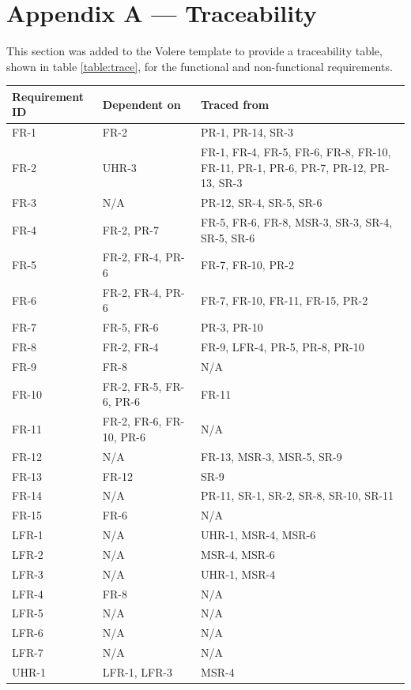 \documentclass[12pt]{article}
\begin{document}
\newpage{}
\section{Appendix A --- Traceability}
This section was added to the Volere template to provide a traceability table,
shown in table \ref{table:trace}, for the functional and non-functional requirements.
\begin{longtable}[c]{| m{3.4cm} | m{4cm} | m{5.3cm} |}
  \hline
  \textbf{Requirement ID} & \textbf{Dependent on} & \textbf{Traced from} \\ \hline
  \endhead
  FR-1 & FR-2 & PR-1, PR-14, SR-3 \\ \hline
  FR-2 & UHR-3 & FR-1, FR-4, FR-5, FR-6, FR-8, FR-10, FR-11, PR-1, PR-6, PR-7, PR-12, PR-13, SR-3 \\ \hline
  FR-3 & N/A & PR-12, SR-4, SR-5, SR-6 \\ \hline
  FR-4 & FR-2, PR-7 & FR-5, FR-6, FR-8, MSR-3, SR-3, SR-4, SR-5, SR-6 \\ \hline
  FR-5 & FR-2, FR-4, PR-6 & FR-7, FR-10, PR-2 \\ \hline
  FR-6 & FR-2, FR-4, PR-6 & FR-7, FR-10, FR-11, FR-15, PR-2 \\ \hline
  FR-7 & FR-5, FR-6 & PR-3, PR-10 \\ \hline
  FR-8 & FR-2, FR-4 & FR-9, LFR-4, PR-5, PR-8, PR-10 \\ \hline
  FR-9 & FR-8 & N/A \\ \hline
  FR-10 & FR-2, FR-5, FR-6, PR-6 & FR-11 \\ \hline
  FR-11 & FR-2, FR-6, FR-10, PR-6 & N/A \\ \hline
  FR-12 & N/A & FR-13, MSR-3, MSR-5, SR-9 \\ \hline
  FR-13 & FR-12 & SR-9 \\ \hline
  FR-14 & N/A & PR-11, SR-1, SR-2, SR-8, SR-10, SR-11 \\ \hline
  FR-15 & FR-6 & N/A \\ \hline
  LFR-1 & N/A & UHR-1, MSR-4, MSR-6 \\ \hline
  LFR-2 & N/A & MSR-4, MSR-6 \\ \hline
  LFR-3 & N/A & UHR-1, MSR-4 \\ \hline
  LFR-4 & FR-8 & N/A \\ \hline
  LFR-5 & N/A & N/A \\ \hline
  LFR-6 & N/A & N/A \\ \hline
  LFR-7 & N/A & N/A \\ \hline
  UHR-1 & LFR-1, LFR-3 & MSR-4 \\ \hline

\end{longtable}
\end{document}
